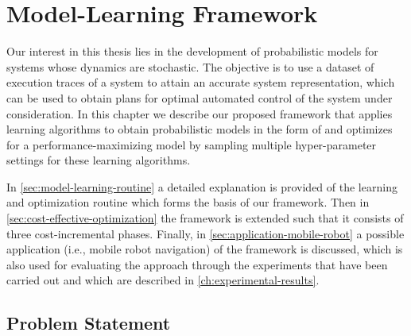 \chapter{Model-Learning Framework}
\label{ch:methodology}

Our interest in this thesis lies in the development of probabilistic models for systems whose dynamics are stochastic.
The objective is to use a dataset of execution traces of a system to attain an accurate system representation, which can be used to obtain plans for optimal automated control of the system under consideration.
In this chapter we describe our proposed framework that applies learning algorithms to obtain probabilistic models in the form of  and optimizes for a performance-maximizing model by sampling multiple hyper-parameter settings for these learning algorithms.

In \autoref{sec:model-learning-routine} a detailed explanation is provided of the learning and optimization routine which forms the basis of our framework.
Then in \autoref{sec:cost-effective-optimization} the framework is extended such that it consists of three cost-incremental phases.
Finally, in \autoref{sec:application-mobile-robot} a possible application (i.e., mobile robot navigation) of the framework is discussed, which is also used for evaluating the approach through the experiments that have been carried out and which are described in \autoref{ch:experimental-results}.

\section{Problem Statement}
\label{sec:problem-statement}

